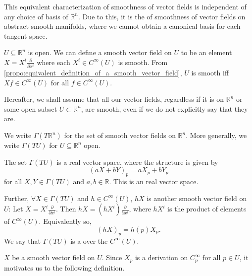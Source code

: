 \documentclass[notoc,notitlepage]{tufte-book}
\begin{document}
\begin{note}
  This equivalent characterization of smoothness of vector fields is independent of any choice
  of basis of $\mathbb{R}^n$. Due to this, it is the  of smoothness
  of vector fields on abstract smooth manifolds, where we cannot obtain a canonical basis for
  each tangent space.
\end{note}

 $U \subseteq \mathbb{R}^n$ is open. We can define a smooth vector field on $U$ to be an element $X =
X^i \frac{\partial}{\partial x^i}$ where each $X^i \in C^\infty(U)$ is smooth. From
\cref{propo:equivalent_definition_of_a_smooth_vector_field}, $U$ is smooth iff $Xf \in
C^\infty(U)$ for all $f \in C^\infty(U)$.

Hereafter, we shall assume that all our vector fields, regardless if it is on $\mathbb{R}^n$ or
some open subset $U \subset \mathbb{R}^n$, are smooth, even if we do not explicitly say that
they are.

\begin{note}[Notation]
  We write $\Gamma(T \mathbb{R}^n)$ for the set of smooth vector fields on $\mathbb{R}^n$. More
  generally, we write $\Gamma(T U)$ for $U \subseteq \mathbb{R}^n$ open.
\end{note}

The set $\Gamma(TU)$ is a real vector space, where the structure is given by
\begin{equation*}
  (aX + bY)_p = aX_p + bY_p
\end{equation*}
for all $X, Y \in \Gamma(TU)$ and $a, b \in \mathbb{R}$. This is an 
 real vector space.

Further, $\forall X \in \Gamma(TU)$ and $h \in C^\infty(U)$, $hX$ is another
smooth vector field on $U$: Let $X = X^i \frac{\partial}{\partial x^i}$. Then $hX = (hX^i)
\frac{\partial}{\partial x^i}$, where $h X^i$ is the product of elements of $C^\infty(U)$.
Equivalently so,
\begin{equation*}
  (hX)_p = h(p) X_p.
\end{equation*}
We say that $\Gamma(TU)$ is a  over the   $C^\infty(U)$.

 $X$ be a smooth vector field on $U$. Since $X_p$ is a derivation on
$C_p^\infty$ for all $p \in U$, it motivates us to the following definition.
\end{document}

